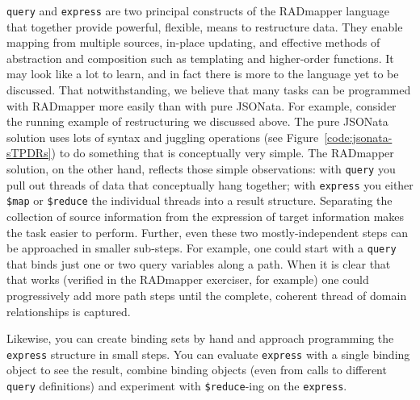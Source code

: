 \documentclass[10pt,letterpaper]{article} %
\newcommand{\stt}[1]{\texttt{#1}} %
\begin{document}
\stt{query} and \stt{express} are two principal constructs of the RADmapper language that together provide powerful, flexible, means to restructure data.
They enable mapping from multiple sources, in-place updating, and effective methods of abstraction and composition such as templating and higher-order functions.
It may look like a lot to learn, and in fact there is more to the language yet to be discussed.
That notwithstanding, we believe that many tasks can be programmed with RADmapper more easily than with pure JSONata.
For example, consider  the running example of restructuring we discussed above.
The pure JSONata solution uses lots of syntax and juggling operations (see Figure~\ref{code:jsonata-sTPDRs}) to do something that is conceptually very simple.
The RADmapper solution, on the other hand, reflects those simple observations: with \stt{query} you pull out threads of data that conceptually hang together;
with \stt{express} you either \stt{\$map} or \stt{\$reduce} the individual threads into a result structure.
Separating the collection of source information from the expression of target information makes the task easier to perform.
Further, even these two mostly-independent steps can be approached in smaller sub-steps.
For example, one could start with a \stt{query} that binds just one or two query variables along a path.
When it is clear that that works (verified in the RADmapper exerciser, for example) one could progressively add more path steps until the complete, coherent thread of domain relationships is captured.

Likewise, you can create binding sets by hand and approach programming the \stt{express} structure in small steps.
You can evaluate \stt{express} with a single binding object to see the result, combine binding objects (even from calls to different \stt{query} definitions) and experiment with \stt{\$reduce}-ing on the \stt{express}.

\end{document}
